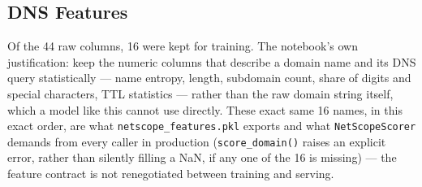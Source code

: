 \documentclass[12pt,a4paper]{report}
\begin{document}
\subsection*{DNS Features}
Of the 44 raw columns, 16 were kept for training. The notebook's own justification: keep the numeric columns that describe a domain name and its DNS query statistically --- name entropy, length, subdomain count, share of digits and special characters, TTL statistics --- rather than the raw domain string itself, which a model like this cannot use directly. These exact same 16 names, in this exact order, are what \texttt{netscope\_features.pkl} exports and what \texttt{NetScopeScorer} demands from every caller in production (\texttt{score\_domain()} raises an explicit error, rather than silently filling a NaN, if any one of the 16 is missing) --- the feature contract is not renegotiated between training and serving.
\end{document}
